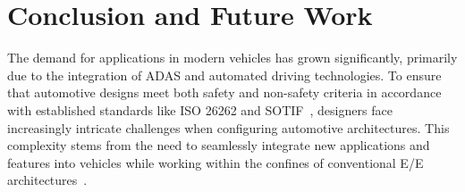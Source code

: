 \chapter{Conclusion and Future Work}\label{conclusion}%

    
    
     
     The demand for applications in modern vehicles has grown significantly, primarily due to the integration of ADAS and automated driving technologies. To ensure that automotive designs meet both safety and non-safety criteria in accordance with established standards like ISO 26262 and SOTIF~\cite{iso26262, sotif}, designers face increasingly intricate challenges when configuring automotive architectures. This complexity stems from the need to seamlessly integrate new applications and features into vehicles while working within the confines of conventional E/E architectures~\cite{askaripoor2022architecture,askaripoor2023designer,9613692}.
     
     
    
